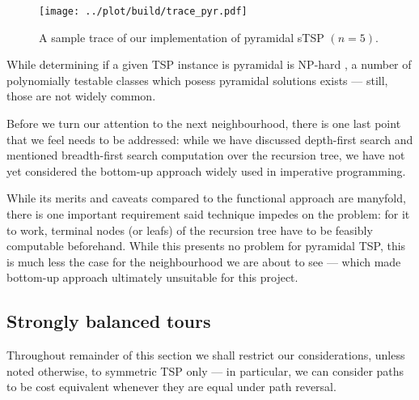 \documentclass[index=totoc,bibliography=totoc]{scrartcl}
\numberwithin{equation}{section}
\numberwithin{figure}{section}
\numberwithin{table}{section}
\begin{document}
\begin{figure}[hbt]
\centering
\texttt{[image: ../plot/build/trace\_pyr.pdf]}
\caption{A sample trace of our implementation of pyramidal sTSP $(n = 5)$.}
\label{fig:pyrstrace}
\end{figure}

\begin{remark}
While determining if a given TSP instance is pyramidal is NP-hard
\cite{baki}, a number of polynomially testable classes which posess
pyramidal solutions exists \cite{baki,gilmore} ---
still, those are not widely common.
\end{remark}

Before we turn our attention to the next neighbourhood, there is one last
point that we feel needs to be addressed: while we have discussed
depth-first search and mentioned breadth-first search computation over the
recursion tree, we have not yet considered the bottom-up approach widely
used in imperative programming.

While its merits and caveats compared to the functional approach are
manyfold, there is one important requirement said technique impedes on the
problem: for it to work, terminal nodes (or leafs) of the recursion tree
have to be feasibly computable beforehand.  While this presents no problem
for pyramidal TSP, this is much less the case for the neighbourhood we are
about to see --- which made bottom-up approach ultimately unsuitable for
this project.

\subsection{Strongly balanced tours}

Throughout remainder of this section we shall restrict our considerations,
unless noted otherwise, to symmetric TSP only --- in particular, we can
consider paths to be cost equivalent whenever they are equal under path
reversal. %
\end{document}

